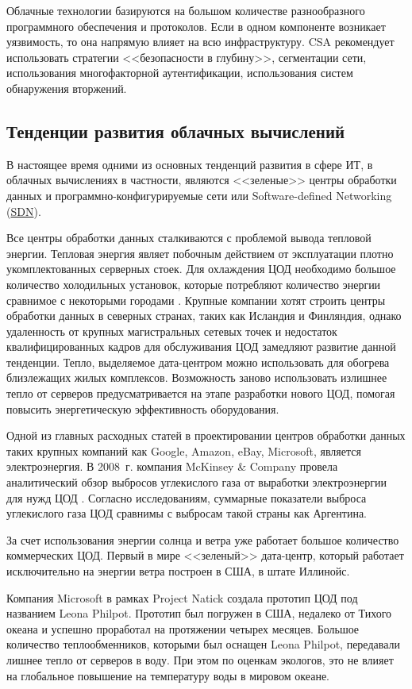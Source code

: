 Облачные технологии базируются на большом количестве разнообразного программного обеспечения и протоколов.
Если в одном компоненте возникает уязвимость, то она напрямую влияет на всю инфраструктуру.
CSA рекомендует использовать стратегии <<безопасности в глубину>>, сегментации сети, использования многофакторной аутентификации, использования систем обнаружения вторжений.

\subsection{Тенденции развития облачных вычислений}

В настоящее время одними из основных тенденций развития в сфере ИТ, в облачных вычислениях в частности, являются <<зеленые>> центры обработки данных и программно-конфигурируемые сети или Software-defined Networking (\hyperlink{sdn}{SDN}).

Все центры обработки данных сталкиваются с проблемой вывода тепловой энергии.
Тепловая энергия являет побочным действием от эксплуатации плотно укомплектованных серверных стоек.
Для охлаждения ЦОД необходимо большое количество холодильных установок, которые потребляют количество энергии сравнимое с некоторыми городами \cite{cnewsdc}.
Крупные компании хотят строить центры обработки данных в северных странах, таких как Исландия и Финляндия, однако удаленность от крупных магистральных сетевых точек и недостаток квалифицированных кадров для обслуживания ЦОД замедляют развитие данной тенденции.
Тепло, выделяемое дата-центром можно использовать для обогрева близлежащих жилых комплексов.
Возможность заново использовать излишнее тепло от серверов предусматривается на этапе разработки нового ЦОД, помогая повысить энергетическую эффективность оборудования.

Одной из главных расходных статей в проектировании центров обработки данных таких крупных компаний как Google, Amazon, eBay, Microsoft, является электроэнергия.
В 2008~г. компания McKinsey \& Company провела аналитический обзор выбросов углекислого газа от выработки электроэнергии для нужд ЦОД \cite{greendc}.
Согласно исследованиям, суммарные показатели выброса углекислого газа ЦОД сравнимы с выбросам такой страны как Аргентина.

За счет использования энергии солнца и ветра уже работает большое количество коммерческих ЦОД.
Первый в мире <<зеленый>> дата-центр, который работает исключительно на энергии ветра построен в США, в штате Иллинойс.

Компания Microsoft в рамках Project Natick создала прототип ЦОД под названием Leona Philpot.
Прототип был погружен в США, недалеко от Тихого океана и успешно проработал на протяжении четырех месяцев.
Большое количество теплообменников, которыми был оснащен Leona Philpot, передавали лишнее тепло от серверов в воду.
При этом по оценкам экологов, это не влияет на глобальное повышение на температуру воды в мировом океане.

